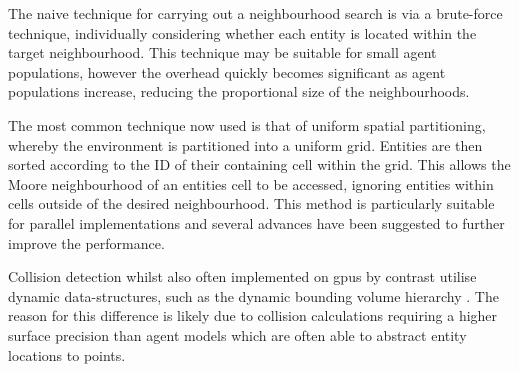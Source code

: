     The naive technique for carrying out a neighbourhood search is via a brute-force technique, individually considering whether each entity is located within the target neighbourhood. This technique may be suitable for small agent populations, however the overhead quickly becomes significant as agent populations increase, reducing the proportional size of the neighbourhoods.
    
    The most common technique now used is that of uniform spatial partitioning, whereby the environment is partitioned into a uniform grid. Entities are then sorted according to the ID of their containing cell within the grid. This allows the Moore neighbourhood of an entities cell to be accessed, ignoring entities within cells outside of the desired neighbourhood. This method is particularly suitable for parallel implementations\cite{Gre10} and several advances have been suggested to further improve the performance\cite{GS*10,Hoe14,HY*15}.
    
    Collision detection whilst also often implemented on \glspl{gpu} by contrast utilise dynamic data-structures, such as the dynamic bounding volume hierarchy \cite{LA06}. The reason for this difference is likely due to collision calculations requiring a higher surface precision than agent models which are often able to abstract entity locations to points.